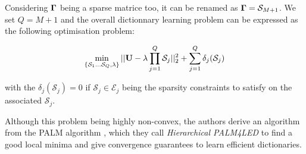 Considering ${\mathbf{\Gamma}}$ being a sparse matrice too, it can be renamed as ${\mathbf{\Gamma}} = \mathcal{S}_{M+1}$. We set $Q = M+1$ and the overall dictionnary learning problem can be expressed as the following optimisation problem:

\begin{equation}
\label{eq:problem_gribon}
\min_{\{\mathcal{S}_1 \dots \mathcal{S}_Q, \lambda\}} ||{\mathbf{U}} - \lambda \prod_{j=1}^{Q}{\mathcal{S}_j}||_2^2 + \sum_{j=1}^{Q} \delta_j(\mathcal{S}_j)
\end{equation}

with the $\delta_j(\mathcal{S}_j) = 0$ if $\mathcal{S}_j \in \mathcal{E}_j$ being the sparsity constraints to satisfy on the associated $\mathcal{S}_j$.

Although this problem being highly non-convex, the authors derive an algorithm from the PALM algorithm \cite{bolte2014proximal}, which they call \textit{Hierarchical PALM4LED} to find a good local minima and give convergence guarantees to learn efficient dictionaries.
